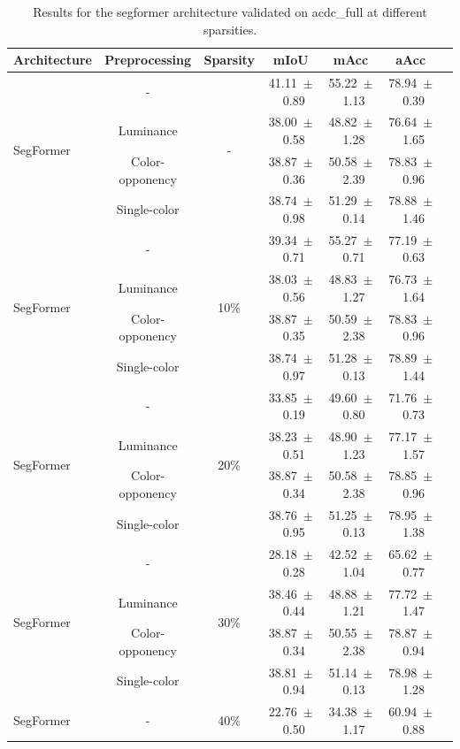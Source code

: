 \begin{table}[h]
\centering
\caption{Results for the segformer architecture validated on acdc_full at different sparsities.}
\begin{tabular}{@{}lccc ccc@{}}
\toprule
Architecture & Preprocessing & Sparsity & mIoU & mAcc & aAcc \\
\midrule

\multirow{4}{*}{SegFormer} & - & \multirow{4}{*}{-} & 41.11~$\pm$~0.89 & 55.22~$\pm$~1.13 & 78.94~$\pm$~0.39 \\
& Luminance & & 38.00~$\pm$~0.58 & 48.82~$\pm$~1.28 & 76.64~$\pm$~1.65 \\
& Color-opponency & & 38.87~$\pm$~0.36 & 50.58~$\pm$~2.39 & 78.83~$\pm$~0.96 \\
& Single-color & & 38.74~$\pm$~0.98 & 51.29~$\pm$~0.14 & 78.88~$\pm$~1.46 \\
\midrule
\multirow{4}{*}{SegFormer} & - & \multirow{4}{*}{10\%} & 39.34~$\pm$~0.71 & 55.27~$\pm$~0.71 & 77.19~$\pm$~0.63 \\
& Luminance & & 38.03~$\pm$~0.56 & 48.83~$\pm$~1.27 & 76.73~$\pm$~1.64 \\
& Color-opponency & & 38.87~$\pm$~0.35 & 50.59~$\pm$~2.38 & 78.83~$\pm$~0.96 \\
& Single-color & & 38.74~$\pm$~0.97 & 51.28~$\pm$~0.13 & 78.89~$\pm$~1.44 \\
\midrule
\multirow{4}{*}{SegFormer} & - & \multirow{4}{*}{20\%} & 33.85~$\pm$~0.19 & 49.60~$\pm$~0.80 & 71.76~$\pm$~0.73 \\
& Luminance & & 38.23~$\pm$~0.51 & 48.90~$\pm$~1.23 & 77.17~$\pm$~1.57 \\
& Color-opponency & & 38.87~$\pm$~0.34 & 50.58~$\pm$~2.38 & 78.85~$\pm$~0.96 \\
& Single-color & & 38.76~$\pm$~0.95 & 51.25~$\pm$~0.13 & 78.95~$\pm$~1.38 \\
\midrule
\multirow{4}{*}{SegFormer} & - & \multirow{4}{*}{30\%} & 28.18~$\pm$~0.28 & 42.52~$\pm$~1.04 & 65.62~$\pm$~0.77 \\
& Luminance & & 38.46~$\pm$~0.44 & 48.88~$\pm$~1.21 & 77.72~$\pm$~1.47 \\
& Color-opponency & & 38.87~$\pm$~0.34 & 50.55~$\pm$~2.38 & 78.87~$\pm$~0.94 \\
& Single-color & & 38.81~$\pm$~0.94 & 51.14~$\pm$~0.13 & 78.98~$\pm$~1.28 \\
\midrule
\multirow{4}{*}{SegFormer} & - & \multirow{4}{*}{40\%} & 22.76~$\pm$~0.50 & 34.38~$\pm$~1.17 & 60.94~$\pm$~0.88 \\

\end{tabular}
\end{table}
